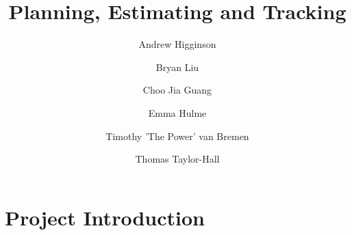 \documentclass{article}
\begin{document}
\title{Planning, Estimating and Tracking}
\author{Andrew Higginson \and Bryan Liu \and Choo Jia Guang \and Emma Hulme \and Timothy 'The Power' van Bremen \and Thomas Taylor-Hall}
\maketitle

\section{Project Introduction}
\end{document}
